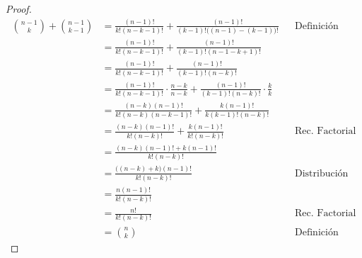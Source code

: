 \begin{enumerate}[label=\alph*)]
\begin{proof}
      \begin{align*}
        \binom{n-1}{k} + \binom{n-1}{k-1} &= \frac{(n-1)!}{k!(n-k-1)!}+ \frac{(n-1)!}{(k-1)!\big((n-1)-(k-1)\big)!} && \text{Definición}\\
        &= \frac{(n-1)!}{k!(n-k-1)!} + \frac{(n-1)!}{(k-1)!(n-1-k+1)!}\\
        &= \frac{(n-1)!}{k!(n-k-1)!} + \frac{(n-1)!}{(k-1)!(n-k)!}\\
        &= \frac{(n-1)!}{k!(n-k-1)!} \cdot \frac{n-k}{n-k} + \frac{(n-1)!}{(k-1)!(n-k)!} \cdot \frac{k}{k}\\
        &= \frac{(n-k)(n-1)!}{k!(n-k)(n-k-1)!} + \frac{k(n-1)!}{k(k-1)!(n-k)!}\\
        &= \frac{(n-k)(n-1)!}{k!(n-k)!} + \frac{k(n-1)!}{k!(n-k)!}&& \text{Rec. Factorial}\\
        &= \frac{(n-k)(n-1)!+k(n-1)!}{k!(n-k)!}\\
        &= \frac{\big((n-k)+k\big)(n-1)!}{k!(n-k)!} && \text{Distribución}\\
        &= \frac{n(n-1)!}{k!(n-k)!}\\
        &= \frac{n!}{k!(n-k)!}&& \text{Rec. Factorial}\\
        &= \binom{n}{k} && \text{Definición}
      \end{align*}
  \end{proof}
  
\clearpage
  

\end{enumerate}
